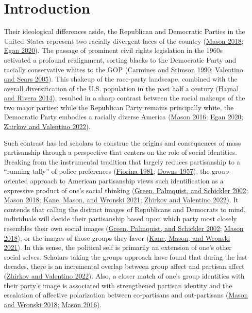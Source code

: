 \documentclass[
  12pt,
]{article}
\begin{document}
\hypertarget{introduction}{%
\section{Introduction}\label{introduction}}

Their ideological differences aside, the Republican and Democratic
Parties in the United States represent two racially divergent faces of
the country (\protect\hyperlink{ref-mason2018}{Mason 2018};
\protect\hyperlink{ref-egan2020}{Egan 2020}). The passage of prominent
civil rights legislation in the 1960s activated a profound realignment,
sorting blacks to the Democratic Party and racially conservative whites
to the GOP (\protect\hyperlink{ref-carmines1990}{Carmines and Stimson
1990}; \protect\hyperlink{ref-valentino2005}{Valentino and Sears 2005}).
This shakeup of the race-party landscape, combined with the overall
diversification of the U.S. population in the past half a century
(\protect\hyperlink{ref-hajnal2014}{Hajnal and Rivera 2014}), resulted
in a sharp contrast between the racial makeups of the two major parties:
while the Republican Party remains principally white, the Democratic
Party embodies a racially diverse America
(\protect\hyperlink{ref-mason2016}{Mason 2016};
\protect\hyperlink{ref-egan2020}{Egan 2020};
\protect\hyperlink{ref-zhirkov2022}{Zhirkov and Valentino 2022}).

Such contrast has led scholars to construe the origins and consequences
of mass partisanship through a perspective that centers on the role of
social identities. Breaking from the instrumental tradition that largely
reduces partisanship to a ``running tally'' of police preferences
(\protect\hyperlink{ref-fiorina1981}{Fiorina 1981};
\protect\hyperlink{ref-downs1957}{Downs 1957}), the group-oriented
approach to American partisanship views such identification as a
expressive product of one's social thinking
(\protect\hyperlink{ref-green2002}{Green, Palmquist, and Schickler
2002}; \protect\hyperlink{ref-mason2018}{Mason 2018};
\protect\hyperlink{ref-kane2021}{Kane, Mason, and Wronski 2021};
\protect\hyperlink{ref-zhirkov2022}{Zhirkov and Valentino 2022}). It
contends that calling the distinct images of Republicans and Democrats
to mind, individuals will decide their partisanship based upon which
party most closely resembles their own social images
(\protect\hyperlink{ref-green2002}{Green, Palmquist, and Schickler
2002}; \protect\hyperlink{ref-mason2018}{Mason 2018}), or the images of
those groups they favor (\protect\hyperlink{ref-kane2021}{Kane, Mason,
and Wronski 2021}). In this sense, the political self is primarily an
extension of one's other social selves. Scholars taking the groups
approach have found that during the last decades, there is an
incremental overlap between group affect and partisan affect
(\protect\hyperlink{ref-zhirkov2022}{Zhirkov and Valentino 2022}). Also,
a closer match of one's group identities with their party's image is
associated with strengthened partisan identity and the escalation of
affective polarization between co-partisans and out-partisans
(\protect\hyperlink{ref-mason2018a}{Mason and Wronski 2018};
\protect\hyperlink{ref-mason2016}{Mason 2016}).
\end{document}
